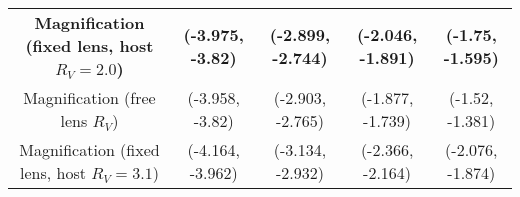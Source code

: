 \begin{table*}
\begin{tabular}{|c|c|c|c|c|}
{\bf Magnification (fixed lens, host $R_V = 2.0$)} & {\bf (-3.975, -3.82)} & {\bf (-2.899, -2.744)} & {\bf (-2.046, -1.891)} & {\bf (-1.75, -1.595)}
\\
Magnification (free lens $R_V$) & (-3.958, -3.82) & (-2.903, -2.765) & (-1.877, -1.739) & (-1.52, -1.381)
\\
Magnification (fixed lens, host $R_V = 3.1$) & (-4.164, -3.962) & (-3.134, -2.932) & (-2.366, -2.164) & (-2.076, -1.874) \\

\hline
\end{tabular}
\label{tab:params}
\end{table*}